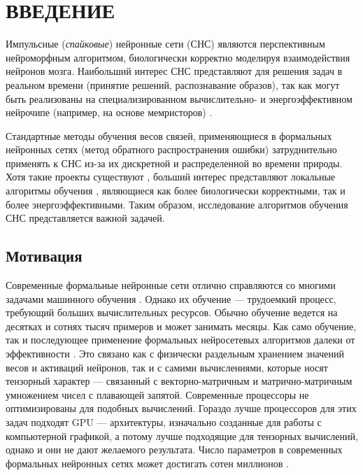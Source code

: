 \documentclass[a4paper]{article}
\begin{document}
\clearpage

\section*{ВВЕДЕНИЕ}
Импульсные (\textit{спайковые}) нейронные сети (СНС) являются перспективным нейроморфным алгоритмом, биологически корректно моделируя взаимодействия нейронов мозга. Наибольший интерес СНС представляют для решения задач в реальном времени (принятие решений, распознавание образов), так как могут быть реализованы на специализированном вычислительно- и энергоэффективном нейрочипе (например, на основе мемристоров) \cite{hardware1}.

Стандартные методы обучения весов связей, применяющиеся в формальных нейронных сетях (метод обратного распространения ошибки) затруднительно применять к СНС из-за их дискретной и распределенной во времени природы. Хотя такие проекты существуют \cite{Lee_2020, backprop_spiking}, больший интерес представляют локальные алгоритмы обучения \cite{STDP}, являющиеся как более биологически корректными, так и более энергоэффективными. Таким образом, исследование алгоритмов обучения СНС представляется важной задачей.

\subsection*{Мотивация}
Современные формальные нейронные сети отлично справляются со многими задачами машинного обучения \cite{pmlr-v28-wan13, Khan_2020}. Однако их обучение --- трудоемкий процесс, требующий больших вычислительных ресурсов. Обычно обучение ведется на десятках и сотнях тысяч примеров и может занимать месяцы. Как само обучение, так и последующее применение формальных нейросетевых алгоритмов далеки от эффективности \cite{Edwards2015GrowingPF}. Это связано как с физически раздельным хранением значений весов и активаций нейронов, так и с самими вычислениями, которые носят тензорный характер --- связанный с векторно-матричным и матрично-матричным умножением чисел с плавающей запятой. Современные процессоры не оптимизированы для подобных вычислений. Гораздо лучше процессоров для этих задач подходят GPU --- архитектуры, изначально созданные для работы с компьютерной графикой, а потому лучше подходящие для тензорных вычислений, однако и они не дают желаемого результата. Число параметров в современных формальных нейронных сетях может достигать сотен миллионов \cite{ManyParams, Khan_2020}.
\end{document}
